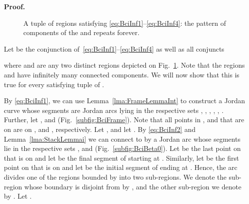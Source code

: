 \documentclass{article}
\newcommand{\qedsymbol}{\ding{113}}
\newenvironment{proof}{\par\noindent\textbf{Proof.}}{\mbox{}\hfill\qedsymbol\par\bigskip}
\begin{document}
\begin{proof}
\begin{figure}[h]
\begin{tikzpicture}[scale=1,
		c0/.style={fill=gray!5},
		c1/.style={fill=gray!5},
		c2/.style={fill=gray!25},
		c3/.style={fill=gray!25}
	]
	\end{tikzpicture}
\caption{A tuple of regions satisfying
  {\eqref{eq:BciInf1}--\eqref{eq:BciInf4}}: the pattern of components of the
   and  repeats forever.}
\label{fig:InfBci}
\end{figure}

Let  be the conjunction of~\eqref{eq:BciInf1}--\eqref{eq:BciInf4}
as well as all conjuncts

where  and  are any two distinct regions depicted on Fig.~\ref{fig:InfBci}. 
Note that the regions  and  have infinitely 
many  connected components. We will now show that this is true for every satisfying 
tuple of . 

By \eqref{eq:BciInf1}, we can use Lemma~\ref{lma:FrameLemmaInt} to construct 
a Jordan curve  whose segments 
are Jordan arcs lying in the respective sets , , 
, , , .
Further, let ,  and 
 (Fig.~\ref{subfig:BciFrame}). Note that all points in
,  and  that are on  are on ,  and , 
respectively. Let , and let . 
By \eqref{eq:BciInf2} and Lemma~\ref{lma:StackLemmai} 
we can connect  to  by a Jordan arc  
whose segments lie in the respective sets , 
 and  (Fig.~\ref{subfig:BciBeta0}). 
Let  be the last point on  that is on  and let  
be the final segment of  starting at . Similarly, let  
be the first point on  that is on  and let 
be the initial segment of  ending at . Hence, the arc  divides one of the regions bounded by  into two 
sub-regions. We denote the sub-region whose boundary is disjoint from  by , and 
the other sub-region we denote by . 
Let .
\begin{figure}[h]\begin{center}
\scriptsize{
	}
\end{center}
\end{figure}
\end{proof}
\end{document}
